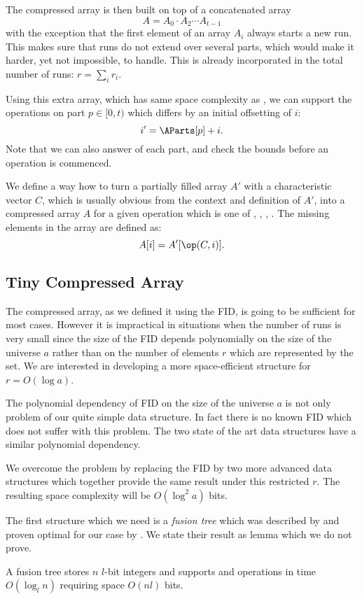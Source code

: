 The compressed array is then built on top of a concatenated array
$$A = A_0 \cdot A_2 \cdots A_{t-1}$$
with the exception that the first element of an array $A_i$ always starts a new run.
This makes sure that runs do not extend over several parts, which would make it harder, yet not impossible, to handle.
This is already incorporated in the total number of runs: $r = \sum_i r_i$.

Using this extra array, which has same space complexity as \ABefore{}, we can support the operations on part $p \in [0, t)$ which differs by an initial offsetting of $i$:
$$i' = \AParts[p] + i.$$
Note that we can also answer \size{} of each part, and check the bounds before an operation is commenced.

\bigbreak

We define a way how to turn a partially filled array $A'$ with a characteristic vector $C$, which is usually obvious from the context and definition of $A'$, into a compressed array $A$ for a given operation \op{} which is one of \pred{}, \succ{}, \prev{}, \nextt{}.
The missing elements in the array are defined as:
$$A[i] = A'[\op(C, i)].$$

\subsection{Tiny Compressed Array}

The compressed array, as we defined it using the FID, is going to be sufficient for most cases.
However it is impractical in situations when the number of runs is very small since the size of the FID depends polynomially on the size of the universe $a$ rather than on the number of elements $r$ which are represented by the set. 
We are interested in developing a more space-efficient structure for $r = O(\log a)$.

The polynomial dependency of FID on the size of the universe $a$ is not only problem of our quite simple data structure.
In fact there is no known FID which does not suffer with this problem.
The two state of the art data structures \cite{patrascu2008succincter, grossi2009more} have a similar polynomial dependency.

We overcome the problem by replacing the FID by two more advanced data structures which together provide the same result under this restricted $r$.
The resulting space complexity will be $O(\log^2 a)$ bits.

\bigbreak

The first structure which we need is a \emph{fusion tree} which was described by \cite{fredman1993surpassing} and proven optimal for our case by \cite{puatracscu2006time}.
We state their result as lemma which we do not prove.
\begin{lemma}
	A fusion tree stores $n$ $l$-bit integers and supports \pred{} and \succ{} operations in time $O(\log_l n)$ requiring space $O(n l)$ bits.
\end{lemma}

